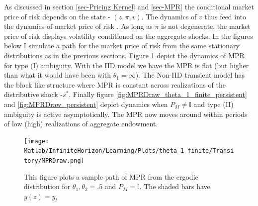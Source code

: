 \documentclass[12pt]{article}
\begin{document}
%
%
As discussed in section \ref{sec-Pricing Kernel}  and \ref{sec-MPR} the conditional market price of risk depends on the state - $(z,\pi,v)$. The dynamics of $v$ thus feed into the dynamics of market price of risk . As long as $\pi$ is not degenerate, the market price of risk displays volatility conditioned on the aggregate shocks.  
%
%
In the figures below I simulate a path for the market price of risk from the same stationary distributions as in the previous sections. Figure \ref{fig:MPRDraw_theta_1_finite_transitory} depict the dynamics of MPR for type (I) ambiguity. With the IID model we have the MPR is flat (but higher than what it would have been with $\theta_1=\infty$). The Non-IID transient model has the block like structure where MPR is constant across realizations of the distributive shock -$s^*$. Finally figure \ref{fig:MPRDraw_theta_1_finite_persistent} and \ref{fig:MPRDraw_persistent} depict dynamics when $P_M\neq \mathbb{I}$ and type (II) ambiguity is active asymptotically. The MPR now moves around within periods of low (high) realizations of aggregate endowment.
\begin{figure}[htbp]
\centering
	  \texttt{[image: Matlab/InfiniteHorizon/Learning/Plots/theta\_1\_finite/Transitory/MPRDraw.png]}

	\caption{\small {This figure plots a sample path of MPR from the ergodic distribution for $\theta_1,\theta_2 =.5$ and $P_M=\mathbb{I}$}. The shaded bars have $y(z)=y_l$}

	\label{fig:MPRDraw_theta_1_finite_transitory}
\end{figure} 
\end{document}
